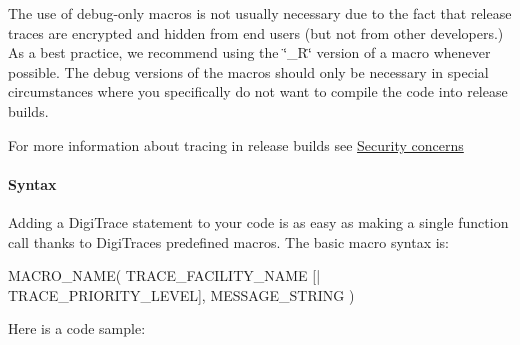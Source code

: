  The use of debug-\/only macros is not usually necessary due to the fact that release traces are encrypted and hidden from end users (but not from other developers.) As a best practice, we recommend using the \char`\"{}\+\_\+\+R\char`\"{} version of a macro whenever possible. The debug versions of the macros should only be necessary in special circumstances where you specifically do not want to compile the code into release builds.

 For more information about tracing in release builds see \hyperlink{a00364_digitrace__tracingfromplugins__security}{Security concerns}

\hypertarget{a00364_digitrace__advancedlogging__macros__syntax}{}\paragraph{Syntax}\label{a00364_digitrace__advancedlogging__macros__syntax}
 Adding a Digi\+Trace statement to your code is as easy as making a single function call thanks to Digi\+Trace\textquotesingle{}s predefined macros. The basic macro syntax is\+:


\begin{DoxyCode}
MACRO\_NAME( TRACE\_FACILITY\_NAME [| TRACE\_PRIORITY\_LEVEL], MESSAGE\_STRING )
\end{DoxyCode}


 Here is a code sample\+:





